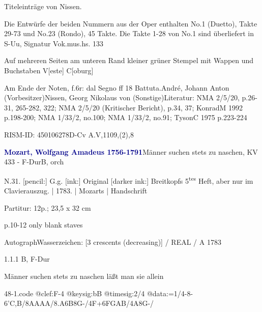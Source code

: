 \documentclass[a4paper, twocolumn, 11pt]{book}
\begin{document}
\newline %
\par Titeleinträge von Nissen.
\par Die Entwürfe der beiden Nummern aus der Oper enthalten No.1 (Duetto), Takte 29-73 und No.23 (Rondo), 45 Takte. Die Takte 1-28 von No.1 sind überliefert in S-Uu, Signatur Vok.mus.hs. 133
\par Auf mehreren Seiten am unteren Rand kleiner grüner Stempel mit Wappen und Buchstaben V[este] C[oburg]
\par Am Ende der Noten, f.6r: {\textquotedbl}dal Segno ff 18 Battuta.{\textquotedbl}\newline André, Johann Anton  (Vorbesitzer)\newline Nissen, Georg Nikolaus von  (Sonstige)\newline Literatur: NMA  2/5/20, p.26-31, 265-282, 322; NMA  2/5/20 (Kritischer Bericht), p.34, 37; KonradM 1992  p.198-200; NMA  1/33/2, no.100; NMA  1/33/2, no.91; TysonC 1975  p.223-224
\par RISM-ID: 450106278\newline D-Cv  A.V,1109,(2),8
\par \vspace{16pt} \textcolor{darkblue}{\textbf{Mozart, Wolfgang Amadeus  1756-1791}}\hfillplus{[48]}\newline Männer suchen stets zu naschen, KV 433 - F-Dur\newline B, orch
\par \begin{itshape} N.31. [pencil:] G.g. [ink:] Original [darker ink:] Breitkopfs 5\textsuperscript{t}\textsuperscript{e}\textsuperscript{s} Heft, aber nur im Clavierauszug. | 1783. | Mozarts | Handschrift\end{itshape} 
\par \textcolor{darkblue}{}  Partitur: 12p.; 23,5 x 32 cm\newline \begin{small} p.10-12 only blank staves\end{small} \newline Autograph\newline Wasserzeichen: [3 crescents (decreasing)] / REAL / A  1783
\par 1.1.1  B, F-Dur\newline \begin{footnotesize} Männer suchen stets zu naschen läßt man sie allein \end{footnotesize}  
\begin{filecontents*}{48-1.code}
@clef:F-4
@keysig:bB
@timesig:2/4
@data:=1/4-8-6'C,B/8AAAA/{8.A6B}8G-/4F+6FGAB/4A8G-/
\end{filecontents*}
\end{document}
